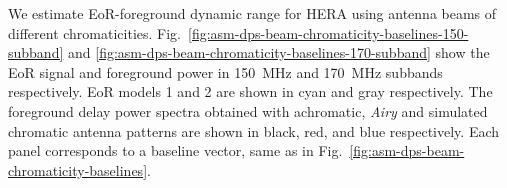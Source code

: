\documentclass[preprint2,iop,numberedappendix,twocolappendix,appendixfloats]{emulateapj}
\begin{document}
We estimate EoR-foreground dynamic range for HERA using antenna beams of different chromaticities. Fig.~\ref{fig:asm-dps-beam-chromaticity-baselines-150-subband} and \ref{fig:asm-dps-beam-chromaticity-baselines-170-subband} show the EoR signal and foreground power in 150~MHz and 170~MHz subbands respectively. EoR models 1 and 2 are shown in cyan and gray respectively. The foreground delay power spectra obtained with achromatic, {\it Airy} and simulated chromatic antenna patterns are shown in black, red, and blue respectively. Each panel corresponds to a baseline vector, same as in Fig.~\ref{fig:asm-dps-beam-chromaticity-baselines}. 

\begin{figure}[htb]
  \centering
   \\

\end{figure}
\end{document}
